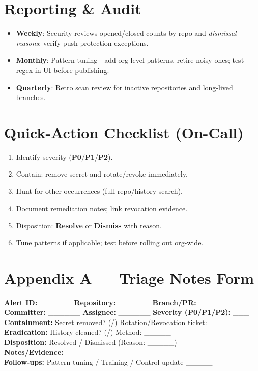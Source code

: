 \documentclass[11pt,a4paper]{article}
\renewcommand{\cmark}{\ding{51}}
\renewcommand{\xmark}{\ding{55}}
\begin{document}
\section{Reporting \& Audit}
\begin{itemize}[leftmargin=1.2em]
  \item \textbf{Weekly}: Security reviews opened/closed counts by repo and \emph{dismissal reasons}; verify push-protection exceptions.
  \item \textbf{Monthly}: Pattern tuning---add org-level patterns, retire noisy ones; test regex in UI before publishing.
  \item \textbf{Quarterly}: Retro scan review for inactive repositories and long-lived branches.
\end{itemize}

\section{Quick-Action Checklist (On-Call)}
\begin{enumerate}[leftmargin=1.2em]
  \item Identify severity (\textbf{P0}/\textbf{P1}/\textbf{P2}).
  \item Contain: remove secret and rotate/revoke immediately.
  \item Hunt for other occurrences (full repo/history search).
  \item Document remediation notes; link revocation evidence.
  \item Disposition: \textbf{Resolve} or \textbf{Dismiss} with reason.
  \item Tune patterns if applicable; test before rolling out org-wide.
\end{enumerate}

\section*{Appendix A --- Triage Notes Form}
\begin{callout}
\textbf{Alert ID:} \_\_\_\_\_\_ \quad \textbf{Repository:} \_\_\_\_\_\_ \quad \textbf{Branch/PR:} \_\_\_\_\_\_\\
\textbf{Committer:} \_\_\_\_\_\_ \quad \textbf{Assignee:} \_\_\_\_\_\_ \quad \textbf{Severity (P0/P1/P2):} \_\_\_\\[2mm]
\textbf{Containment:} Secret removed? (\cmark/\xmark) \quad Rotation/Revocation ticket: \_\_\_\_\_\\[2mm]
\textbf{Eradication:} History cleaned? (\cmark/\xmark) \quad Method: \_\_\_\_\_\\[2mm]
\textbf{Disposition:} Resolved / Dismissed (Reason: \_\_\_\_\_)\\[2mm]
\textbf{Notes/Evidence:} \hrulefill\\[2mm]
\textbf{Follow-ups:} Pattern tuning / Training / Control update \_\_\_\_\_
\end{callout}
\end{document}
